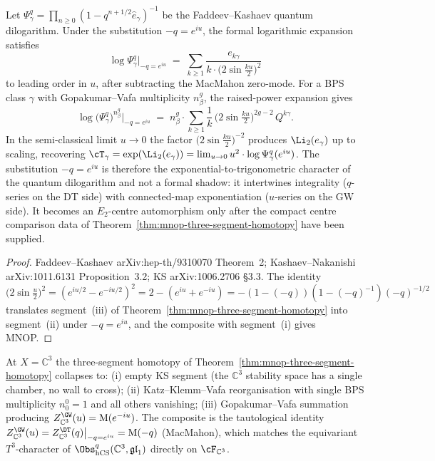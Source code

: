 \begin{lemma}
\label{lem:mnop-qdilog-u}
Let $\Psi^{q}_\gamma = \prod_{n\geq 0}(1 - q^{n+1/2}\widehat{e}_\gamma)^{-1}$
be the Faddeev--Kashaev quantum dilogarithm. Under the substitution
$-q = e^{iu}$, the formal logarithmic expansion satisfies
\[
 \log \Psi^{q}_\gamma\big|_{-q = e^{iu}}
 \;=\;
 \sum_{k\geq 1} \frac{e_{k\gamma}}{k \cdot \bigl(2\sin\tfrac{ku}{2}\bigr)^{2}}
\]
to leading order in $u$, after subtracting the MacMahon zero-mode. For
a BPS class $\gamma$ with Gopakumar--Vafa multiplicity $n^{g}_\beta$,
the raised-power expansion gives
\[
 \log \bigl(\Psi^{q}_\gamma\bigr)^{n^{g}_\beta}\big|_{-q = e^{iu}}
 \;=\;
 n^{g}_\beta \cdot
 \sum_{k\geq 1} \frac{1}{k}\,
 \bigl(2\sin\tfrac{k u}{2}\bigr)^{2g-2}\, Q^{k\gamma}.
\]
In the semi-classical limit $u \to 0$ the factor
$\bigl(2\sin\tfrac{ku}{2}\bigr)^{-2}$ produces $\Li_2(e_\gamma)$ up to
scaling, recovering
$\cT_\gamma = \exp(\Li_2(e_\gamma)) =
 \lim_{u \to 0} u^{2} \cdot \log \Psi^{q}_\gamma(e^{iu})$.
The substitution $-q = e^{iu}$ is therefore the
exponential-to-trigonometric character of the quantum dilogarithm and
not a formal shadow: it intertwines integrality ($q$-series on the DT
side) with connected-map exponentiation ($u$-series on the GW side). It
becomes an $E_2$-centre automorphism only after the compact centre
comparison data of Theorem~\ref{thm:mnop-three-segment-homotopy} have
been supplied.
\end{lemma}

\begin{proof}
Faddeev--Kashaev \textup{arXiv:hep-th/9310070} Theorem~2;
Kashaev--Nakanishi \textup{arXiv:1011.6131} Proposition~3.2; KS
\textup{arXiv:1006.2706} \S3.3. The identity
$\bigl(2\sin\tfrac{u}{2}\bigr)^{2} = (e^{iu/2} - e^{-iu/2})^{2}
 = 2 - (e^{iu} + e^{-iu}) = -(1 - (-q))(1 - (-q)^{-1}) (-q)^{-1/2}$
translates segment~(iii) of
Theorem~\ref{thm:mnop-three-segment-homotopy} into segment~(ii) under
$-q = e^{iu}$, and the composite with segment~(i) gives MNOP.
\end{proof}

\begin{proposition}
\label{prop:mnop-c3-single-chamber}
At $X = \mathbb{C}^{3}$ the three-segment homotopy of
Theorem~\ref{thm:mnop-three-segment-homotopy} collapses to: (i) empty
KS segment (the $\mathbb{C}^{3}$ stability space has a single chamber,
no wall to cross); (ii) Katz--Klemm--Vafa reorganisation with single BPS
multiplicity $n^{0}_{0} = 1$ and all others vanishing; (iii)
Gopakumar--Vafa summation producing
$Z^{\GW}_{\mathbb{C}^{3}}(u) = \mathrm{M}(e^{-iu})$. The composite is
the tautological identity
$Z^{\GW}_{\mathbb{C}^{3}}(u) = Z^{\DT}_{\mathbb{C}^{3}}(q)\big|_{-q = e^{iu}}
 = \mathrm{M}(-q)$
(MacMahon), which matches the equivariant $T^{3}$-character of
$\Obs^{q}_{\hCS}(\mathbb{C}^{3}, \mathfrak{gl}_{1})$ directly on
$\cF_{\mathbb{C}^{3}}$.
\end{proposition}

